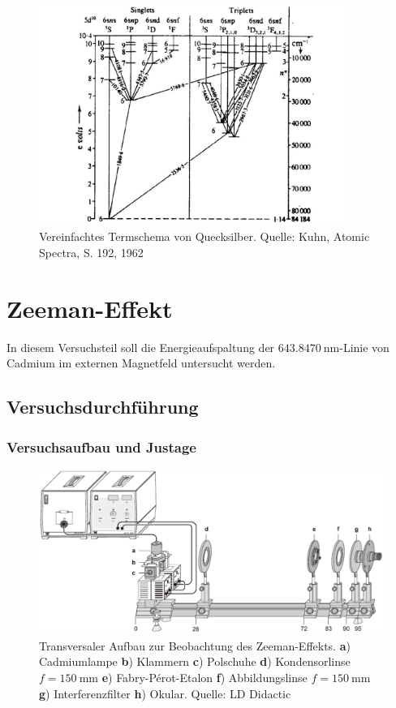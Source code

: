 \documentclass[11pt, a4paper]{article}
\begin{document}
\begin{figure}[!h]
\centering
\includegraphics[width=0.9\textwidth]{./figures/termschema_hg.pdf}
\caption{Vereinfachtes Termschema von Quecksilber. Quelle: Kuhn, Atomic Spectra, S. 192, 1962}
\label{fig:termschema_hg}
\end{figure}

\clearpage

\section{Zeeman-Effekt}
In diesem Versuchsteil soll die Energieaufspaltung der $\SI{643,8470}{\nano\metre}$-Linie von Cadmium im externen Magnetfeld untersucht werden.

\subsection{Versuchsdurchführung}

\subsubsection{Versuchsaufbau und Justage}
\begin{figure}[h]
	\centering
	\includegraphics[width=1.0\textwidth]{./figures/aufbau_zeeman.pdf}
	\caption{Transversaler Aufbau zur Beobachtung des Zeeman-Effekts. \textbf{a}) Cadmiumlampe \textbf{b}) Klammern \textbf{c}) Polschuhe \textbf{d}) Kondensorlinse $f=\SI{150}{\milli\metre}$ \textbf{e}) Fabry-Pérot-Etalon \textbf{f}) Abbildungslinse $f=\SI{150}{\milli\metre}$ \textbf{g}) Interferenzfilter \textbf{h}) Okular. Quelle: LD Didactic}
	\label{fig:aufbau_zeeman}
\end{figure}
\end{document}
